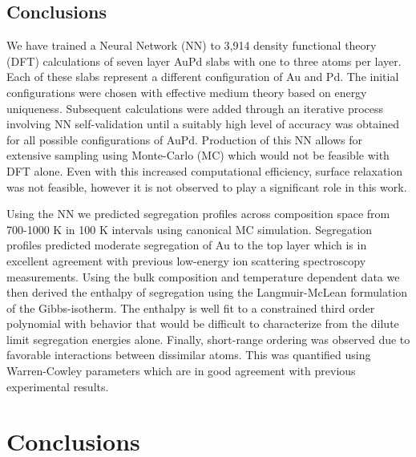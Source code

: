 \documentclass[12pt]{cmuthesis}
\begin{document}
\section{Conclusions}
\label{sec:org9ebca2a}
We have trained a Neural Network (NN) to 3,914 density functional theory (DFT) calculations of seven layer AuPd slabs with one to three atoms per layer. Each of these slabs represent a different configuration of Au and Pd. The initial configurations were chosen with effective medium theory based on energy uniqueness. Subsequent calculations were added through an iterative process involving NN self-validation until a suitably high level of accuracy was obtained for all possible configurations of AuPd. Production of this NN allows for extensive sampling using Monte-Carlo (MC) which would not be feasible with DFT alone. Even with this increased computational efficiency, surface relaxation was not feasible, however it is not observed to play a significant role in this work.

Using the NN we predicted segregation profiles across composition space from 700-1000 K in 100 K intervals using canonical MC simulation. Segregation profiles predicted moderate segregation of Au to the top layer which is in excellent agreement with previous low-energy ion scattering spectroscopy measurements. Using the bulk composition and temperature dependent data we then derived the enthalpy of segregation using the Langmuir-McLean formulation of the Gibbs-isotherm. The enthalpy is well fit to a constrained third order polynomial with behavior that would be difficult to characterize from the dilute limit segregation energies alone. Finally, short-range ordering was observed due to favorable interactions between dissimilar atoms. This was quantified using Warren-Cowley parameters which are in good agreement with previous experimental results.

\chapter{Conclusions}
\label{sec:ch7}


\end{document}
